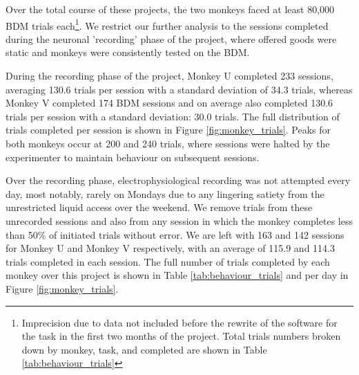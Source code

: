 Over the total course of these projects, the two monkeys faced at least 80,000 BDM trials each\footnote{Imprecision due to data not included before the rewrite of the software for the task in the first two months of the project. Total trials numbers broken down by monkey, task, and completed are shown in Table \ref{tab:behaviour_trials}}. We restrict our further analysis to the sessions completed during the neuronal 'recording' phase of the project, where offered goods were static and monkeys were consistently tested on the BDM.

During the recording phase of the project, Monkey U completed 233 sessions, averaging 130.6 trials per session with a standard deviation of 34.3 trials, whereas Monkey V completed 174 BDM sessions and on average also completed 130.6 trials per session with a standard deviation: 30.0 trials. The full distribution of trials completed per session is shown in Figure \ref{fig:monkey_trials}. Peaks for both monkeys occur at 200 and 240 trials, where sessions were halted by the experimenter to maintain behaviour on subsequent sessions.

Over the recording phase, electrophysiological recording was not attempted every day, most notably, rarely on Mondays due to any lingering satiety from the unrestricted liquid access over the weekend. We remove trials from these unrecorded sessions and also from any session in which the monkey completes less than 50\% of initiated trials without error. We are left with 163 and 142 sessions for Monkey U and Monkey V respectively, with an average of 115.9 and 114.3 trials completed in each session. The full number of trials completed by each monkey over this project is shown in Table \ref{tab:behaviour_trials} and per day in Figure \ref{fig:monkey_trials}.

